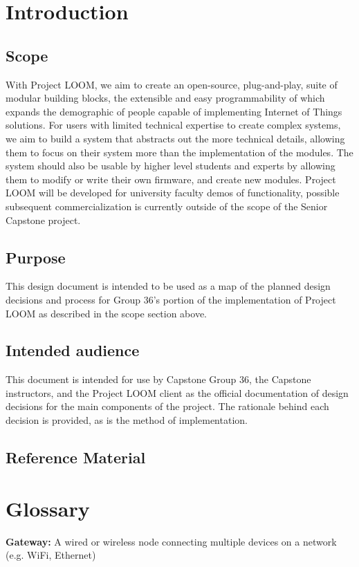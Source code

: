 \documentclass[onecolumn, draftclsnofoot,10pt, compsoc]{IEEEtran}
\begin{document}
\section{Introduction}
\subsection{Scope}  
With Project LOOM, we aim to create an open-source, plug-and-play, suite of modular building blocks, the extensible and easy programmability of which expands the demographic of people capable of implementing Internet of Things solutions. For users with limited technical expertise to create complex systems, we aim to build a system that abstracts out the more technical details, allowing them to focus on their system more than the implementation of the modules. The system should also be usable by higher level students and experts by allowing them to modify or write their own firmware, and create new modules. Project LOOM will be developed for university faculty demos of functionality, possible subsequent commercialization is currently outside of the scope of the Senior Capstone project.

\subsection{Purpose}
This design document is intended to be used as a map of the planned design decisions and process for Group 36's portion of the implementation of Project LOOM as described in the scope section above.
                
\subsection{Intended audience}
This document is intended for use by Capstone Group 36, the Capstone instructors, and the Project LOOM client as the official documentation of design decisions for the main components of the project. The rationale behind each decision is provided, as is the method of implementation.

\subsection{Reference Material}
    \renewcommand{\listfigurename}{}
    \vspace{-40pt}
    \listoffigures

\section{Glossary}
    \textbf{Gateway:} A wired or wireless node connecting multiple devices on a network (e.g. WiFi, Ethernet)
\end{document}
